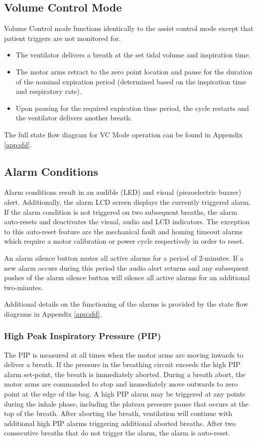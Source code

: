 \documentclass[]{article}
\begin{document}
\subsection{Volume Control Mode}
\label{sect:vcMode}
Volume Control mode functions identically to the assist control mode except that patient triggers are not monitored for.
\begin{itemize}
	\item The ventilator delivers a breath at the set tidal volume and inspiration time.
	\item The motor arms retract to the zero point location and pause for the duration of the nominal expiration period (determined based on the inspiration time and respiratory rate).
	\item Upon pausing for the required expiration time period, the cycle restarts and the ventilator delivers another breath.
\end{itemize}
The full state flow diagram for VC Mode operation can be found in Appendix \ref{app:sfd}.

\subsection{Alarm Conditions}
\label{sect:alarms}

Alarm conditions result in an audible (LED) and visual (piezoelectric buzzer) alert. Additionally, the alarm LCD screen displays the currently triggered alarm.  If the alarm condition is not triggered on two subsequent breaths, the alarm auto-resets and deactivates the visual, audio and LCD indicators.  The exception to this auto-reset feature are the mechanical fault and homing timeout alarms which require a motor calibration or power cycle respectively in order to reset. 

An alarm silence button mutes all active alarms for a period of 2-minutes.  If a new alarm occurs during this period the audio alert returns and any subsequent pushes of the alarm silence button will silence all active alarms for an additional two-minutes.

Additional details on the functioning of the alarms is provided by the state flow diagrams in Appendix \ref{app:sfd}.

\subsubsection{High Peak Inspiratory Pressure (PIP)}
The PIP is measured at all times when the motor arms are moving inwards to deliver a breath.  If the pressure in the breathing circuit exceeds the high PIP alarm set-point, the breath is immediately aborted. During a breath abort, the motor arms are commanded to stop and immediately move outwards to zero point at the edge of the bag.  A high PIP alarm may be triggered at any points during the inhale phase, including the plateau pressure pause that occurs at the top of the breath.  After aborting the breath, ventilation will continue with additional high PIP alarms triggering additional aborted breaths.  After two consecutive breaths that do not trigger the alarm, the alarm is auto-reset.
\end{document}
